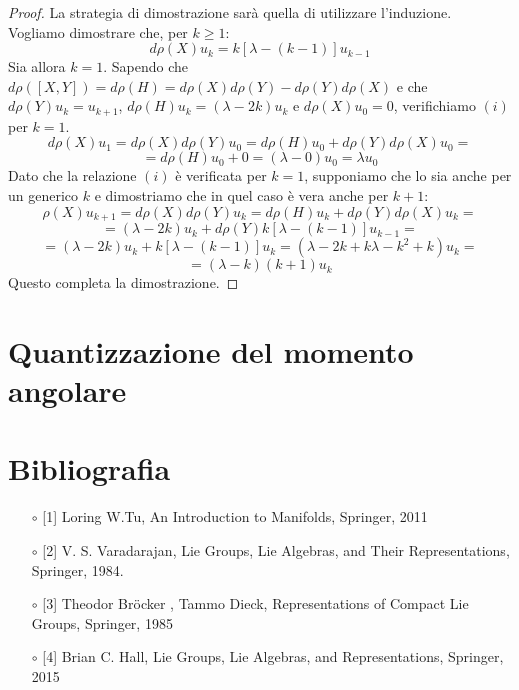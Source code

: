 \documentclass[12pt,a4paper]{report}
\theoremstyle{definition}
\theoremstyle{definition}
\theoremstyle{definition}
\theoremstyle{remark}
\begin{document}
\begin{proof}
	La strategia di dimostrazione sarà quella di utilizzare l'induzione.
	Vogliamo dimostrare che, per $k\geq 1$:
	\begin{equation}
		\label{eq:4}
		d\rho(X)u_k=k[\lambda-(k-1)]u_{k-1} 
\tag{i}
\end{equation}
	Sia allora $k=1$. Sapendo che $d\rho([X,Y])=d\rho(H)=d\rho(X)d\rho(Y)-d\rho(Y)d\rho(X)$ e che $d\rho(Y)u_k=u_{k+1}$, $d\rho(H)u_k=(\lambda-2k)u_k$ e $d\rho(X)u_0=0$, verifichiamo $(i)$ per $k=1$.
	$$d\rho(X)u_1=d\rho(X)d\rho(Y)u_0=d\rho(H)u_0+d\rho(Y)d\rho(X)u_0=$$$$=d\rho(H)u_0+0=(\lambda-0)u_0=\lambda u_0$$
	Dato che la relazione $(i)$ è verificata per $k=1$, supponiamo che lo sia anche per un generico $k$ e dimostriamo che in quel caso è vera anche per $k+1$:
	$$\rho(X)u_{k+1}=d\rho(X)d\rho(Y)u_{k}=d\rho(H)u_k+d\rho(Y)d\rho(X)u_k=$$
	$$=(\lambda-2k)u_k+d\rho(Y)k[\lambda-(k-1)]u_{k-1}=$$ 
	$$=(\lambda-2k)u_k+k[\lambda-(k-1)]u_{k}=(\lambda-2k+k\lambda-k^2+k)u_k=$$
	$$=(\lambda-k)(k+1)u_k$$
	Questo completa la dimostrazione.
\end{proof}
\chapter{Quantizzazione del momento angolare}
\chapter*{Bibliografia}
\begin{itemize}
	\item[$\circ$] [1] Loring W.Tu, An Introduction to Manifolds, Springer, 2011
	\item[$\circ$] [2] V. S. Varadarajan, Lie Groups, Lie Algebras, and Their Representations, Springer,
	1984.
	\item[$\circ$] [3] Theodor Bröcker , Tammo Dieck, Representations of Compact Lie Groups, Springer, 1985
	\item[$\circ$] [4] Brian C. Hall, Lie Groups, Lie Algebras, and Representations, Springer, 2015
\end{itemize}
\end{document}
